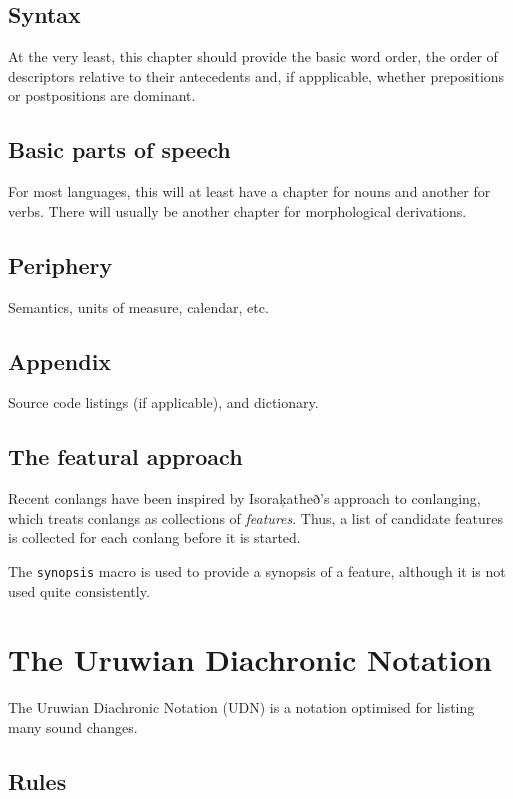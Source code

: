 \documentclass{book}
\begin{document}
\section{Syntax}

At the very least, this chapter should provide the basic word order, the order of descriptors relative to their antecedents and, if appplicable, whether prepositions or postpositions are dominant.

\section{Basic parts of speech}

For most languages, this will at least have a chapter for nouns and another for verbs. There will usually be another chapter for morphological derivations.

\section{Periphery}

Semantics, units of measure, calendar, etc.

\section{Appendix}

Source code listings (if applicable), and dictionary.

\section{The featural approach}

Recent conlangs have been inspired by Isoraķatheð's approach to conlanging, which treats conlangs as collections of \emph{features}. Thus, a list of candidate features is collected for each conlang before it is started.

The \texttt{\bs{}synopsis} macro is used to provide a synopsis of a feature, although it is not used quite consistently.

\chapter{The Uruwian Diachronic Notation}
\label{chapter:udn}

The Uruwian Diachronic Notation (UDN) is a notation optimised for listing many sound changes.

\section{Rules}
\end{document}
